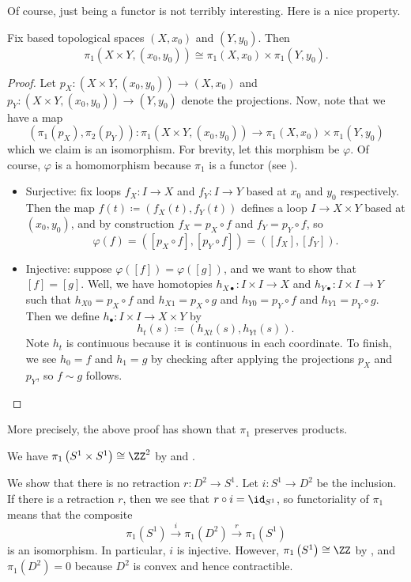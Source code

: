 \documentclass[../notes.tex]{subfiles}
\begin{document}
Of course, just being a functor is not terribly interesting. Here is a nice property.
\begin{proposition} \label{prop:pi1-prods}
	Fix based topological spaces $(X,x_0)$ and $(Y,y_0)$. Then
	\[\pi_1(X\times Y,(x_0,y_0))\cong\pi_1(X,x_0)\times\pi_1(Y,y_0).\]
\end{proposition}
\begin{proof}
	Let $p_X\colon(X\times Y,(x_0,y_0))\to(X,x_0)$ and $p_Y\colon(X\times Y,(x_0,y_0))\to(Y,y_0)$ denote the projections. Now, note that we have a map
	\[(\pi_1(p_X),\pi_2(p_Y))\colon\pi_1(X\times Y,(x_0,y_0))\to\pi_1(X,x_0)\times\pi_1(Y,y_0)\]
	which we claim is an isomorphism. For brevity, let this morphism be $\varphi$. Of course, $\varphi$ is a homomorphism because $\pi_1$ is a functor (see ).
	\begin{itemize}
		\item Surjective: fix loops $f_X\colon I\to X$ and $f_Y\colon I\to Y$ based at $x_0$ and $y_0$ respectively. Then the map $f(t)\coloneqq(f_X(t),f_Y(t))$ defines a loop $I\to X\times Y$ based at $(x_0,y_0)$, and by construction $f_X=p_X\circ f$ and $f_Y=p_Y\circ f$, so
		\[\varphi(f)=([p_X\circ f],[p_Y\circ f])=([f_X],[f_Y]).\]
		\item Injective: suppose $\varphi([f])=\varphi([g])$, and we want to show that $[f]=[g]$. Well, we have homotopies $h_{X\bullet}\colon I\times I\to X$ and $h_{Y\bullet}\colon I\times I\to Y$ such that $h_{X0}=p_X\circ f$ and $h_{X1}=p_X\circ g$ and $h_{Y0}=p_Y\circ f$ and $h_{Y1}=p_Y\circ g$. Then we define $h_\bullet\colon I\times I\to X\times Y$ by
		\[h_t(s)\coloneqq(h_{Xt}(s),h_{Yt}(s)).\]
		Note $h_t$ is continuous because it is continuous in each coordinate. To finish, we see $h_0=f$ and $h_1=g$ by checking after applying the projections $p_X$ and $p_Y$, so $f\sim g$ follows.
		\qedhere
	\end{itemize}
\end{proof}
\begin{remark}
	More precisely, the above proof has shown that $\pi_1$ preserves products.
\end{remark}
\begin{example}
	We have $\pi_1\left(S^1\times S^1\right)\cong\ZZ^2$ by  and .
\end{example}
\begin{example} \label{ex:no-retraction-d2-s1}
	We show that there is no retraction $r\colon D^2\to S^1$. Let $i\colon S^1\to D^2$ be the inclusion. If there is a retraction $r$, then we see that $r\circ i=\id_{S^1}$, so functoriality of $\pi_1$ means that the composite
	\[\pi_1\left(S^1\right)\stackrel i\to\pi_1\left(D^2\right)\stackrel r\to\pi_1\left(S^1\right)\]
	is an isomorphism. In particular, $i$ is injective. However, $\pi_1\left(S^1\right)\cong\ZZ$ by , and $\pi_1\left(D^2\right)=0$ because $D^2$ is convex and hence contractible.
\end{example}
\end{document}
